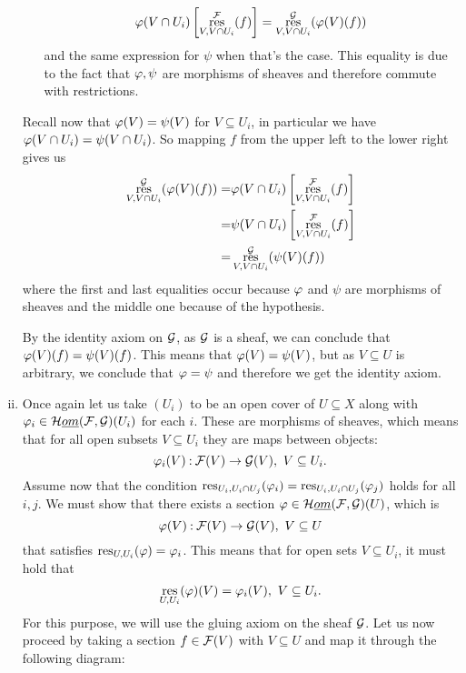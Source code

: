 \documentclass[12pt]{memoir}
\begin{document}
\begin{ptcbr}
\begin{enumerate}[i)]
\begin{itemize}
    $$\varphi(V\cap U_i)\left\lbrack\operatorname*{res}^{\mathcal{F}}_{V,V\cap U_i}(f)\right\rbrack=\operatorname*{res}^{\mathcal{G}}_{V,V\cap U_i}(\varphi(V)(f))$$
    and the same expression for $\psi$ when that's the case. This equality is due to the fact that $\varphi,\psi$ are morphisms of sheaves and therefore commute with restrictions.
\end{itemize}
Recall now that $\varphi(V)=\psi(V)$ for $V\subseteq U_i$, in particular we have $\varphi(V\cap U_i)=\psi(V\cap U_i)$. So mapping $f$ from the upper left to the lower right gives us
\begin{align*}
\operatorname*{res}^{\mathcal{G}}_{V,V\cap U_i}(\varphi(V)(f))= &\varphi(V\cap U_i)\left\lbrack\operatorname*{res}^{\mathcal{F}}_{V,V\cap U_i}(f)\right\rbrack\\
=&\psi(V\cap U_i)\left\lbrack\operatorname*{res}^{\mathcal{F}}_{V,V\cap U_i}(f)\right\rbrack\\
=&\operatorname*{res}^{\mathcal{G}}_{V,V\cap U_i}(\psi(V)(f))
\end{align*}
where the first and last equalities occur because $\varphi$ and $\psi$ are morphisms of sheaves and the middle one because of the hypothesis.\par 
By the identity axiom on $\mathcal{G}$, as $\mathcal{G}$ is a sheaf, we can conclude that $\varphi(V)(f)=\psi(V)(f)$. This means that $\varphi(V)=\psi(V)$, but as $V\subseteq U$ is arbitrary, we conclude that $\varphi=\psi$ and therefore we get the identity axiom.
\item Once again let us take $(U_i)$ to be an open cover of $U\subseteq X$ along with $\varphi_i\in\mathcal{H}\emph{om}(\mathcal{F},\mathcal{G})(U_i)$ for each $i$. These are morphisms of sheaves, which means that for all open subsets $V\subseteq U_i$  they are maps between objects: 
$$\varphi_i(V)\mathbin{:}\mathcal{F}(V)\to\mathcal{G}(V),\ V\subseteq U_i.$$
Assume now that the condition $\operatorname*{res}_{U_i,U_i\cap U_j}(\varphi_i)=\operatorname*{res}_{U_i,U_i\cap U_j}(\varphi_j)$ holds for all $i,j$. We must show that there exists a section $\varphi\in\mathcal{H}\emph{om}(\mathcal{F},\mathcal{G})(U)$, which is
$$\varphi(V)\mathbin{:}\mathcal{F}(V)\to\mathcal{G}(V),\ V\subseteq U$$
that satisfies $\operatorname*{res}_{U,U_i}(\varphi)=\varphi_i$. This means that for open sets $V\subseteq U_i$, it must hold that 
$$\operatorname*{res}_{U,U_i}(\varphi)(V)=\varphi_i(V),\ V\subseteq U_i.$$
For this purpose, we will use the gluing axiom on the sheaf $\mathcal{G}$. Let us now proceed by taking a section $f\in\mathcal{F}(V)$ with $V\subseteq U$ and map it through the following diagram:
\begin{center}

\end{center}
\end{enumerate}
\end{ptcbr}
\end{document}
